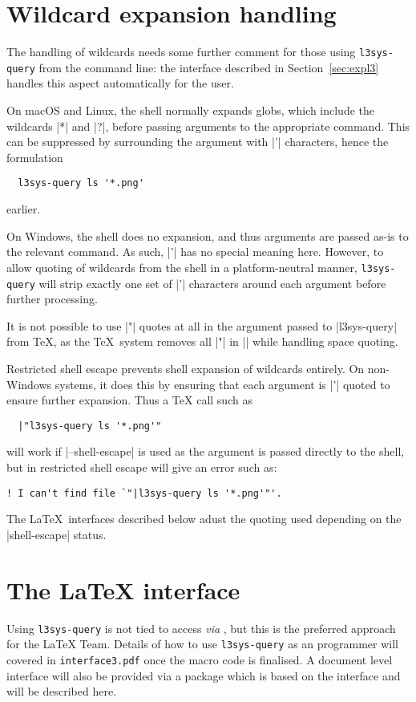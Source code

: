 \documentclass{l3doc}
\begin{document}
\begin{documentation}
\section{Wildcard expansion handling\label{sec:wildcard}}

The handling of wildcards needs some further comment for those using
\texttt{l3sys-query} from the command line: the  interface described
in Section~\ref{sec:expl3} handles this aspect automatically for the user.

On macOS and Linux, the shell normally expands globs, which include the
wildcards |*| and |?|, before passing arguments to the appropriate command.
This can be suppressed by surrounding the argument with |'| characters, hence
the formulation
\begin{verbatim}
  l3sys-query ls '*.png'
\end{verbatim}
earlier.

On Windows, the shell does no expansion, and thus arguments are passed as-is to
the relevant command. As such, |'| has no special meaning here. However, to
allow quoting of wildcards from the shell in a platform-neutral manner,
\texttt{l3sys-query} will strip exactly one set of |'| characters around each
argument before further processing.

It is not possible to use |"| quotes at all in the argument passed to
|l3sys-query| from \TeX, as the \TeX\ system removes all |"| in || while
handling space quoting.

Restricted shell escape prevents shell expansion of wildcards entirely. On
non-Windows systems, it does this by ensuring that each argument is |'| quoted
to ensure further expansion. Thus a \TeX{} call such as
\begin{verbatim}
  |"l3sys-query ls '*.png'"
\end{verbatim}
will work if |--shell-escape| is used as the argument is passed directly to the
shell, but in restricted shell escape will give an error such as:
\begin{verbatim}
! I can't find file `"|l3sys-query ls '*.png'"'.
\end{verbatim}
The \LaTeX\ interfaces described below adust the quoting used depending on the
|shell-escape| status.

\section{The \LaTeX{} interface\label{sec:expl3}}

Using \texttt{l3sys-query} is not tied to access \emph{via} , but
this is the preferred approach for the \LaTeX{} Team. Details of how to use
\texttt{l3sys-query} as an  programmer will covered in
\texttt{interface3.pdf} once the macro code is finalised. A document level
interface will also be provided via a  package which is based
on the  interface and will be described here.

\end{documentation}

\PrintIndex
\end{document}
